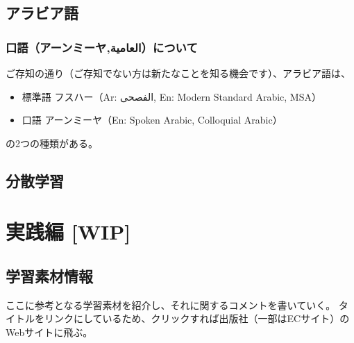 \documentclass[
]{book}
\providecommand{\tightlist}{%
  \setlength{\itemsep}{0pt}\setlength{\parskip}{0pt}}
\begin{document}
\hypertarget{theory_arabic}{%
\chapter{アラビア語}\label{theory_arabic}}

\hypertarget{colloquial}{%
\section{口語（アーンミーヤ,العامية）について}\label{colloquial}}

ご存知の通り（ご存知でない方は新たなことを知る機会です）、アラビア語は、

\begin{itemize}
\tightlist
\item
  標準語 フスハー（Ar: الفصحى, En: Modern Standard Arabic, MSA）
\item
  口語 アーンミーヤ（En: Spoken Arabic, Colloquial Arabic）
\end{itemize}

の2つの種類がある。

\hypertarget{distr_learn}{%
\chapter{分散学習}\label{distr_learn}}

\hypertarget{part-ux5b9fux8df5ux7de8-wip}{%
\part{実践編 {[}WIP{]}}\label{part-ux5b9fux8df5ux7de8-wip}}

\hypertarget{resource}{%
\chapter{学習素材情報}\label{resource}}

ここに参考となる学習素材を紹介し、それに関するコメントを書いていく。 タイトルをリンクにしているため、クリックすれば出版社（一部はECサイト）のWebサイトに飛ぶ。
\end{document}
